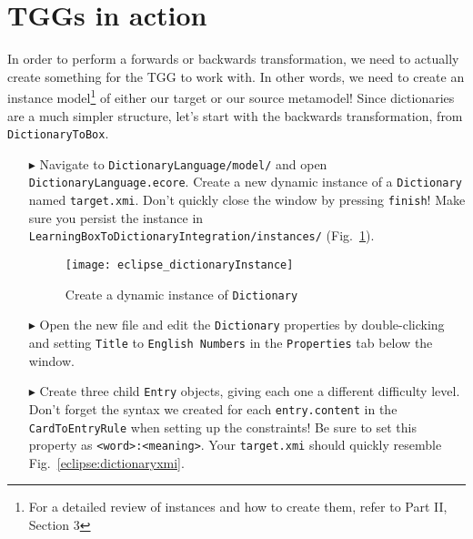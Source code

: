 \newpage
\section{TGGs in action}
\genHeader
\label{sect:TGGs_in_Action}

In order to perform a forwards or backwards transformation, we need to actually create something for the TGG to work with. In other words, we need to create an
instance model\footnote{For a detailed review of instances and how to create them, refer to Part II, Section 3} of either our target or our source metamodel!
Since dictionaries are a much simpler structure, let's start with the backwards transformation, from \texttt{DictionaryToBox}.

\begin{itemize}

\item[$\blacktriangleright$] Navigate to \texttt{Dictionary\-Language/model/} and open \texttt{Dictio\-nary\-Lang\-uage.ecore}. Create a new
dynamic instance of a \texttt{Dictionary} named \texttt{target.xmi}. Don't quickly close the window by pressing \texttt{finish}! Make sure you persist the
instance in \texttt{Learn\-ing\-Box\-To\-Dictionary\-In\-te\-gra\-tion/in\-stan\-ces/} (Fig.~\ref{eclipse:create_instance_dict}).

\begin{figure}[htbp]
\begin{center}
  \texttt{[image: eclipse\_dictionaryInstance]}
  \caption{Create a dynamic instance of \texttt{Dictionary}}
  \label{eclipse:create_instance_dict}
\end{center}
\end{figure}

\newpage

\item[$\blacktriangleright$] Open the new file and edit the \texttt{Dictionary} properties by double-clicking and setting \texttt{Title} to \texttt{English
Numbers} in the \texttt{Properties} tab below the window.

\vspace{0.5cm}

\item[$\blacktriangleright$] Create three child \texttt{Entry} objects, giving each one a different difficulty level. Don't forget the syntax we created for
each \texttt{entry.content} in the \texttt{CardToEntryRule} when setting up the constraints! Be sure to set this property as \texttt{<word>:<meaning>}. Your
\texttt{target.xmi} should quickly resemble Fig.~\ref{eclipse:dictionaryxmi}.


\end{itemize}
